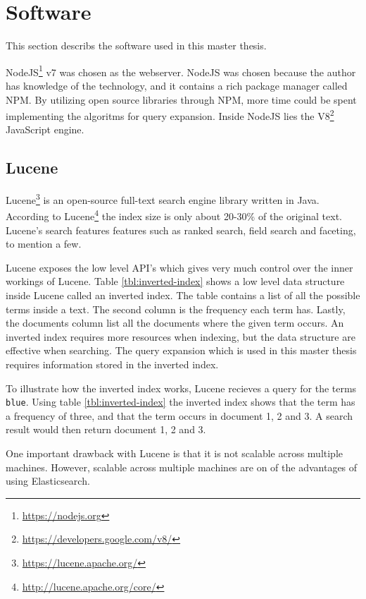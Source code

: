 \section{Software}
This section describs the software used in this master thesis.

NodeJS\footnote{\url{https://nodejs.org}} v7 was chosen as the webserver.
NodeJS was chosen because the author has knowledge of the technology,
and it contains a rich package manager called NPM.
By utilizing open source libraries through NPM, more time could be spent implementing the algoritms for query expansion.
Inside NodeJS lies the V8\footnote{\url{https://developers.google.com/v8/}} JavaScript engine.

\subsection{Lucene}
Lucene\footnote{\url{https://lucene.apache.org/}} is an open-source full-text search engine library written in Java.
According to Lucene\footnote{\url{http://lucene.apache.org/core/}} the index size is only about 20-30\% of the original text.
Lucene's search features features such as ranked search, field search and faceting, to mention a few.

Lucene exposes the low level API's which gives very much control over the inner workings of Lucene.
Table \ref{tbl:inverted-index} shows a low level data structure inside Lucene called an inverted index.
The table contains a list of all the possible terms inside a text.
The second column is the frequency each term has.
Lastly, the documents column list all the documents where the given term occurs.
An inverted index requires more resources when indexing,
but the data structure are effective when searching.
The query expansion which is used in this master thesis requires information stored in the inverted index.

To illustrate how the inverted index works, Lucene recieves a query for the terms \texttt{blue}.
Using table \ref{tbl:inverted-index} the inverted index shows that the term has a frequency of three,
and that the term occurs in document 1, 2 and 3.
A search result would then return document 1, 2 and 3.

One important drawback with Lucene is that it is not scalable across multiple machines.
However, scalable across multiple machines are on of the advantages of using Elasticsearch.

